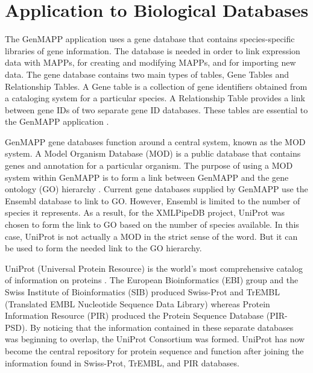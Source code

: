 \section{Application to Biological Databases}
\label{biodb}
The GenMAPP application uses a gene database that contains species-specific 
libraries of gene information.  The database is needed in order to link expression
data with MAPPs, for creating and modifying MAPPs, and for importing new data.  
The gene database contains two main types of tables, Gene Tables and Relationship 
Tables.  A Gene table is a collection of gene identifiers obtained from a 
cataloging system for a particular species.  A Relationship Table provides a link 
between gene IDs of two separate gene ID databases.  These tables are essential to
the GenMAPP application \cite{noSupport}.  

GenMAPP gene databases function around a central system, known as the MOD system.  
A Model Organism Database (MOD) is a public database that contains genes and 
annotation for a particular organism.  
The purpose of using a MOD system within GenMAPP is to form a link between
GenMAPP and the gene ontology (GO) hierarchy \cite{noSupport}.  Current gene 
databases supplied by GenMAPP use the Ensembl database to link to GO.  However, 
Ensembl is limited to the number of species it represents.  
As a result, for the XMLPipeDB project, UniProt was chosen to form the link to GO
based on the number of species available.  In this case, UniProt is not 
actually a MOD in the strict sense of the word.  But it can be used to form the 
needed link to the GO hierarchy.  

UniProt (Universal Protein Resource) is the world's most comprehensive catalog of 
information on proteins \cite{uniprotWeb}.  
The European Bioinformatics (EBI) group and the
Swiss Institute of Bioinformatics (SIB) produced Swiss-Prot and TrEMBL 
(Translated EMBL Nucleotide Sequence Data Library)
whereas 
Protein Information Resource (PIR) produced the Protein Sequence Database (PIR-PSD).  
By noticing that the information contained in these separate databases was beginning
to overlap, the UniProt Consortium was formed.  
UniProt has now become the central repository 
for protein sequence and function after joining the information found in 
Swiss-Prot, TrEMBL, and PIR databases.  

